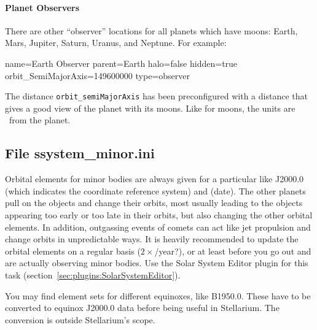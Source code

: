 \paragraph{Planet Observers}
\label{sec:ssystem.ini:PlanetObserver}

There are other ``observer'' locations for all planets which have moons: Earth, Mars, Jupiter, Saturn, Uranus, and Neptune.
For example:
\begin{configfile}
name=Earth Observer
parent=Earth
halo=false
hidden=true
orbit_SemiMajorAxis=149600000
type=observer
\end{configfile}

The distance \texttt{orbit\_semiMajorAxis} has been preconfigured  with a
distance that gives a good view of the planet with its moons. 
Like for moons, the units are \km\ from the planet. 

\subsection{File ssystem\_minor.ini}
\label{sec:ssystem.ini:minor}

Orbital elements for minor bodies are always given for a particular
 like J2000.0 (which indicates the coordinate
reference system) and  (date). The other planets pull
on the objects and change their orbits, most usually leading to the
objects appearing too early or too late in their orbits, but also
changing the other orbital elements. In addition, outgassing events of
comets can act like jet propulsion and change orbits in unpredictable
ways.  It is heavily recommended to update the orbital elements on a
regular basis ($2\times$/year?), or at least before you go out and are
actually observing minor bodies.  Use the Solar System Editor plugin
for this task (section~\ref{sec:plugins:SolarSystemEditor}).

You may find element sets for different equinoxes, like B1950.0. These
have to be converted to equinox J2000.0 data before being useful in
Stellarium. The conversion is outside Stellarium's scope.

